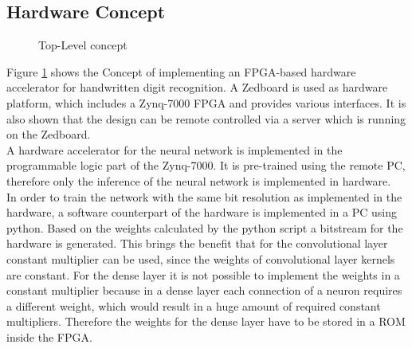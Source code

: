 \subsection{Hardware Concept}
\begin{figure}[h]
	\centering
	
	\caption[Top-Level concept.]{Top-Level concept}
	\label{fig:hw-concept}
\end{figure}
\noindent
Figure \ref{fig:hw-concept} shows the Concept of implementing an FPGA-based hardware accelerator for handwritten digit recognition. A Zedboard is used as hardware platform, which includes a Zynq-7000 FPGA and provides various interfaces. It is also shown that the design can be remote controlled via a server which is running on the Zedboard. \\
A hardware accelerator for the neural network is implemented in the programmable logic part of the Zynq-7000. It is pre-trained using the remote PC, therefore only the inference of the neural network is implemented in hardware. \\
In order to train the network with the same bit resolution as implemented in the hardware, a software counterpart of the hardware is implemented in a PC using python. 
Based on the weights calculated by the python script a bitstream for the hardware is generated. This brings the benefit that for the convolutional layer constant multiplier can be used, since the weights of convolutional layer kernels are constant. For the dense layer it is not possible to implement the weights in a constant multiplier because in a dense layer each connection of a neuron requires a different weight, which would result in a huge amount of required constant multipliers. Therefore the weights for the dense layer have to be stored in a ROM inside the FPGA.   \\

